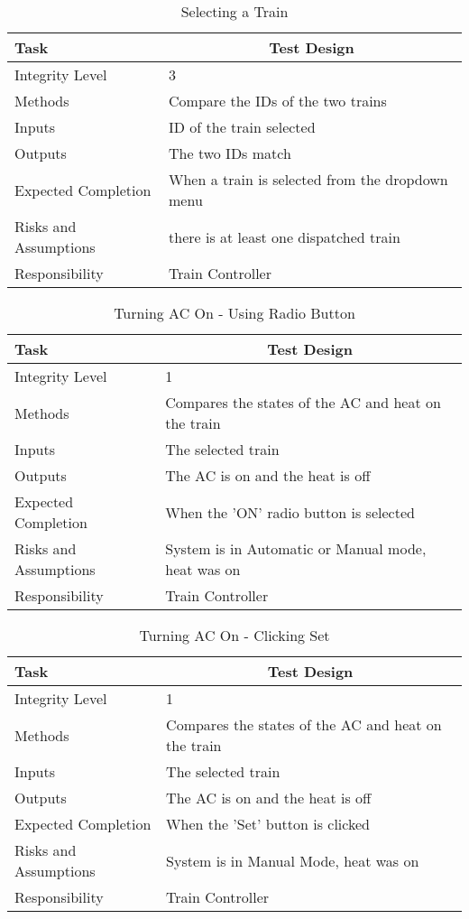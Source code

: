 \documentclass[]{article}
\begin{document}
\begin{table}[H]
	\centering
	\caption{Selecting a Train}
	\begin{tabular}{|l|l|}
		\hline
		Task & \multicolumn{1}{c|}{Test Design} \\ \hline
		Integrity Level & 3 \\ \hline
		Methods & Compare the IDs of the two trains\\ \hline
		Inputs & ID of the train selected \\ \hline
		Outputs &  The two IDs match\\ \hline
		Expected Completion & When a train is selected from the dropdown menu\\ \hline
		Risks and Assumptions & there is at least one dispatched train\\ \hline
		Responsibility & Train Controller\\ \hline
	\end{tabular}
\end{table}

\begin{table}[H]
	\centering
	\caption{Turning AC On - Using Radio Button}
	\begin{tabular}{|l|l|}
		\hline
		Task & \multicolumn{1}{c|}{Test Design} \\ \hline
		Integrity Level & 1 \\ \hline
		Methods & Compares the states of the AC and heat on the train\\ \hline
		Inputs & The selected train\\ \hline
		Outputs & The AC is on and the heat is off \\ \hline
		Expected Completion & When the 'ON' radio button is selected\\ \hline
		Risks and Assumptions & System is in Automatic or Manual mode, heat was on \\ \hline
		Responsibility & Train Controller\\ \hline
	\end{tabular}
\end{table}

\begin{table}[H]
	\centering
	\caption{Turning AC On - Clicking Set}
	\begin{tabular}{|l|l|}
		\hline
		Task & \multicolumn{1}{c|}{Test Design} \\ \hline
		Integrity Level & 1 \\ \hline
		Methods & Compares the states of the AC and heat on the train\\ \hline
		Inputs & The selected train\\ \hline
		Outputs & The AC is on and the heat is off \\ \hline
		Expected Completion & When the 'Set' button is clicked\\ \hline
		Risks and Assumptions & System is in Manual Mode, heat was on \\ \hline
		Responsibility &  Train Controller\\ \hline
	\end{tabular}
\end{table}
\end{document}
